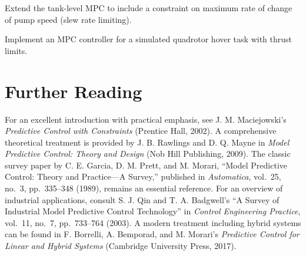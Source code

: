 \begin{exercise}
Extend the tank-level MPC to include a constraint on maximum rate of change of pump speed (slew rate limiting).
\end{exercise}

\begin{exercise}
Implement an MPC controller for a simulated quadrotor hover task with thrust limits.
\end{exercise}

\section*{Further Reading}

For an excellent introduction with practical emphasis, see J. M. Maciejowski's \textit{Predictive Control with Constraints} (Prentice Hall, 2002). A comprehensive theoretical treatment is provided by J. B. Rawlings and D. Q. Mayne in \textit{Model Predictive Control: Theory and Design} (Nob Hill Publishing, 2009). The classic survey paper by C. E. Garcia, D. M. Prett, and M. Morari, ``Model Predictive Control: Theory and Practice---A Survey,'' published in \textit{Automatica}, vol.~25, no.~3, pp.~335--348 (1989), remains an essential reference. For an overview of industrial applications, consult S. J. Qin and T. A. Badgwell's ``A Survey of Industrial Model Predictive Control Technology'' in \textit{Control Engineering Practice}, vol.~11, no.~7, pp.~733--764 (2003). A modern treatment including hybrid systems can be found in F. Borrelli, A. Bemporad, and M. Morari's \textit{Predictive Control for Linear and Hybrid Systems} (Cambridge University Press, 2017).

